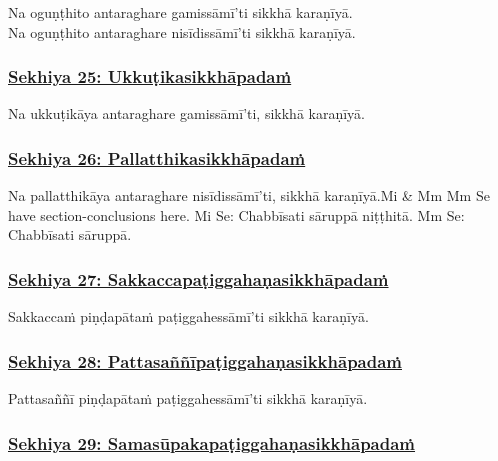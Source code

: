 Na oguṇṭhito antaraghare gamissāmī'ti sikkhā karaṇīyā.\\
Na oguṇṭhito antaraghare nisīdissāmī'ti sikkhā karaṇīyā.



\subsubsection*{\hyperref[training25]{Sekhiya 25: Ukkuṭikasikkhāpadaṁ}}
\label{sekh25}

Na ukkuṭikāya antaraghare gamissāmī'ti, sikkhā karaṇīyā.



\subsubsection*{\hyperref[training26]{Sekhiya 26: Pallatthikasikkhāpadaṁ}}
\label{sekh26}

Na pallatthikāya antaraghare nisīdissāmī'ti, sikkhā karaṇīyā.\makeatletter\hyperlink{endnote-appendix}\makeatother Mi & Mm Mm Se have section-conclusions here. Mi Se: Chabbīsati sāruppā niṭṭhitā. Mm Se: Chabbīsati sāruppā.



\subsubsection*{\hyperref[training27]{Sekhiya 27: Sakkaccapaṭiggahaṇasikkhāpadaṁ}}
\label{sekh27}

Sakkaccaṁ piṇḍapātaṁ paṭiggahessāmī'ti sikkhā karaṇīyā.



\subsubsection*{\hyperref[training28]{Sekhiya 28: Pattasaññīpaṭiggahaṇasikkhāpadaṁ}}
\label{sekh28}

Pattasaññī piṇḍapātaṁ paṭiggahessāmī'ti sikkhā karaṇīyā.



\subsubsection*{\hyperref[training29]{Sekhiya 29: Samasūpakapaṭiggahaṇasikkhāpadaṁ}}
\label{sekh29}

